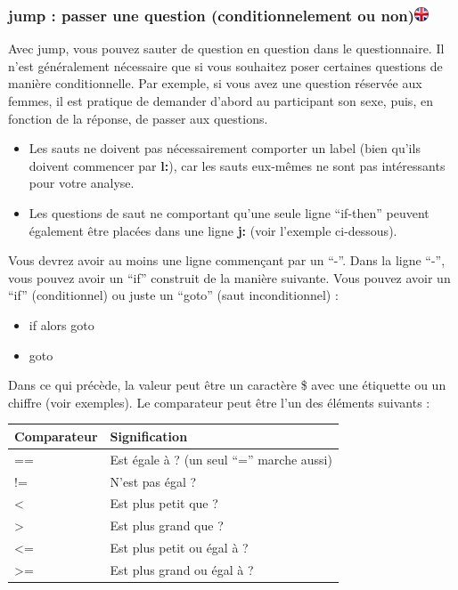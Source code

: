\documentclass[
]{book}
\providecommand{\tightlist}{%
  \setlength{\itemsep}{0pt}\setlength{\parskip}{0pt}}
\begin{document}
\hypertarget{jump-passer-une-question-conditionnelement-ou-non}{%
\subsubsection[jump : passer une question (conditionnelement ou non)]{\texorpdfstring{jump : passer une question (conditionnelement ou non)\href{https://www.psytoolkit.org/doc3.1.0/online-survey-syntax.html\#jump}{\protect\includegraphics{img/ukflag.png}}}{jump : passer une question (conditionnelement ou non)}}\label{jump-passer-une-question-conditionnelement-ou-non}}

Avec jump, vous pouvez sauter de question en question dans le questionnaire. Il n'est généralement nécessaire que si vous souhaitez poser certaines questions de manière conditionnelle. Par exemple, si vous avez une question réservée aux femmes, il est pratique de demander d'abord au participant son sexe, puis, en fonction de la réponse, de passer aux questions.

\begin{itemize}
\tightlist
\item
  Les sauts ne doivent pas nécessairement comporter un label (bien qu'ils doivent commencer par \textbf{l:}), car les sauts eux-mêmes ne sont pas intéressants pour votre analyse.
\item
  Les questions de saut ne comportant qu'une seule ligne ``if-then'' peuvent également être placées dans une ligne \textbf{j:} (voir l'exemple ci-dessous).
\end{itemize}

Vous devrez avoir au moins une ligne commençant par un ``-''. Dans la ligne ``-'', vous pouvez avoir un ``if'' construit de la manière suivante. Vous pouvez avoir un ``if'' (conditionnel) ou juste un ``goto'' (saut inconditionnel) :

\begin{itemize}
\tightlist
\item
  if alors goto 
\item
  goto 
\end{itemize}

Dans ce qui précède, la valeur peut être un caractère \$ avec une étiquette ou un chiffre (voir exemples). Le comparateur peut être l'un des éléments suivants :

\begin{longtable}[]{@{}ll@{}}
\toprule
Comparateur & Signification\tabularnewline
\midrule
\endhead
== & Est égale à ? (un seul ``='' marche aussi)\tabularnewline
!= & N'est pas égal ?\tabularnewline
\textless{} & Est plus petit que ?\tabularnewline
\textgreater{} & Est plus grand que ?\tabularnewline
\textless= & Est plus petit ou égal à ?\tabularnewline
\textgreater= & Est plus grand ou égal à ?\tabularnewline
\bottomrule
\end{longtable}
\end{document}
